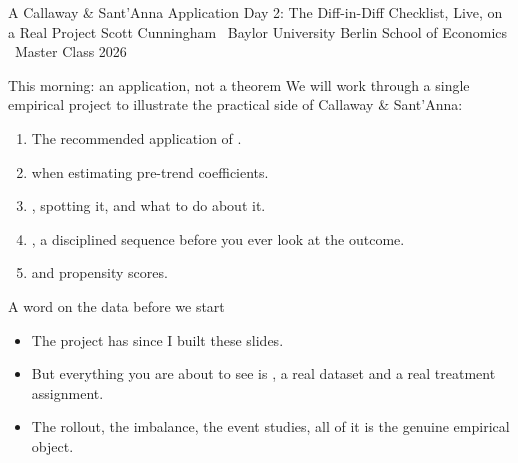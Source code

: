 \documentclass[aspectratio=169,11pt]{beamer}
\begin{document}

\codechellatitle
  {A Callaway \& Sant'Anna Application}
  {Day 2: The Diff-in-Diff Checklist, Live, on a Real Project}
  {Scott Cunningham \textperiodcentered\ Baylor University}
  {Berlin School of Economics \textperiodcentered\ Master Class 2026}


\begin{frame}{This morning: an application, not a theorem}
\vspace{0.4em}
We will work through a single empirical project to illustrate the practical side of Callaway \& Sant'Anna:
\vspace{0.5em}
\begin{enumerate}\setlength\itemsep{0.5em}
  \item[(a)] The recommended application of .
  \item[(b)]  when estimating pre-trend coefficients.
  \item[(c)] , spotting it, and what to do about it.
  \item[(d)] , a disciplined sequence before you ever look at the outcome.
  \item[(e)]  and propensity scores.
\end{enumerate}
\vspace{0.6em}
\end{frame}

\begin{frame}{A word on the data before we start}
\vspace{0.8em}
\begin{itemize}\setlength\itemsep{0.7em}
  \item The project has  since I built these slides.
  \item But everything you are about to see is , a real dataset and a real treatment assignment.
  \item {} The rollout, the imbalance, the event studies, all of it is the genuine empirical object.
\end{itemize}
\end{frame}
\end{document}
